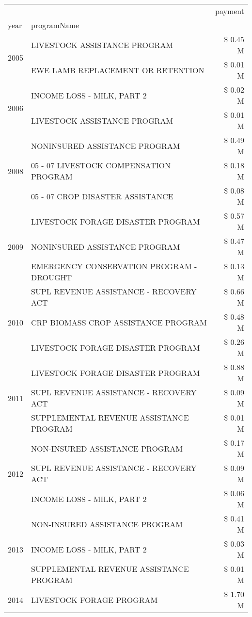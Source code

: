 \begin{tabular}{llr}
\toprule
 &  & payment \\
year & programName &  \\
\midrule
\multirow[t]{2}{*}{2005} & LIVESTOCK ASSISTANCE PROGRAM & \$ 0.45 M \\
 & EWE LAMB REPLACEMENT OR RETENTION & \$ 0.01 M \\
\cline{1-3}
\multirow[t]{2}{*}{2006} & INCOME LOSS - MILK, PART 2 & \$ 0.02 M \\
 & LIVESTOCK ASSISTANCE PROGRAM & \$ 0.01 M \\
\cline{1-3}
\multirow[t]{3}{*}{2008} & NONINSURED ASSISTANCE PROGRAM & \$ 0.49 M \\
 & 05 - 07 LIVESTOCK COMPENSATION PROGRAM & \$ 0.18 M \\
 & 05 - 07 CROP DISASTER ASSISTANCE & \$ 0.08 M \\
\cline{1-3}
\multirow[t]{3}{*}{2009} & LIVESTOCK FORAGE DISASTER  PROGRAM & \$ 0.57 M \\
 & NONINSURED ASSISTANCE PROGRAM & \$ 0.47 M \\
 & EMERGENCY CONSERVATION PROGRAM - DROUGHT & \$ 0.13 M \\
\cline{1-3}
\multirow[t]{3}{*}{2010} & SUPL REVENUE ASSISTANCE - RECOVERY ACT & \$ 0.66 M \\
 & CRP BIOMASS CROP ASSISTANCE PROGRAM & \$ 0.48 M \\
 & LIVESTOCK FORAGE DISASTER PROGRAM & \$ 0.26 M \\
\cline{1-3}
\multirow[t]{3}{*}{2011} & LIVESTOCK FORAGE DISASTER PROGRAM & \$ 0.88 M \\
 & SUPL REVENUE ASSISTANCE - RECOVERY ACT & \$ 0.09 M \\
 & SUPPLEMENTAL REVENUE ASSISTANCE PROGRAM & \$ 0.01 M \\
\cline{1-3}
\multirow[t]{3}{*}{2012} & NON-INSURED ASSISTANCE PROGRAM & \$ 0.17 M \\
 & SUPL REVENUE ASSISTANCE - RECOVERY ACT & \$ 0.09 M \\
 & INCOME LOSS - MILK, PART 2 & \$ 0.06 M \\
\cline{1-3}
\multirow[t]{3}{*}{2013} & NON-INSURED ASSISTANCE PROGRAM & \$ 0.41 M \\
 & INCOME LOSS - MILK, PART 2 & \$ 0.03 M \\
 & SUPPLEMENTAL REVENUE ASSISTANCE PROGRAM & \$ 0.01 M \\
\cline{1-3}
\multirow[t]{3}{*}{2014} & LIVESTOCK FORAGE PROGRAM & \$ 1.70 M \\

\end{tabular}
